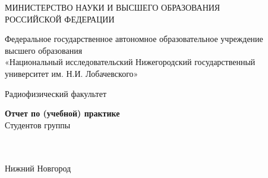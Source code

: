 \begin{titlepage}
	\centering

	МИНИСТЕРСТВО НАУКИ И ВЫСШЕГО ОБРАЗОВАНИЯ \\
	РОССИЙСКОЙ ФЕДЕРАЦИИ

	\vspace{1em}
	Федеральное государственное автономное образовательное учреждение \\
	высшего образования \\
	«Национальный исследовательский Нижегородский государственный \\
	университет им. Н.И. Лобачевского»

	\vspace{1em}
	Радиофизический факультет

	\vfill
	\begin{minipage}{0.8\linewidth}
		\centering\large\bfseries\MakeUppercase{\labtheme}
	\end{minipage}

	\vfill
	\begin{flushright}
		\begin{minipage}{0.48\textwidth}
			\raggedright
			{\bfseries Отчет по (учебной) практике}\\
			Студентов группы \labgroupshort \\
			\course \\
			\labauthors \\
			\vspace{1em}
			\studyprogram
		\end{minipage}
	\end{flushright}

	\vfill
	Нижний Новгород \the\year{}
\end{titlepage}

\newpage
\thispagestyle{empty}
\null
\newpage
\setcounter{page}{1} 